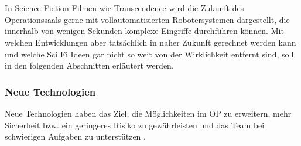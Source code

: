 \chapter{}
\label{sec:overview}

In Science Fiction Filmen wie Transcendence wird die Zukunft des Operationssaals gerne mit vollautomatisierten Robotersystemen dargestellt, die innerhalb von wenigen Sekunden komplexe Eingriffe durchführen können. 
Mit welchen Entwicklungen aber tatsächlich in naher Zukunft gerechnet werden kann und welche Sci Fi Ideen gar nicht so weit von der Wirklichkeit entfernt sind, soll in den folgenden Abschnitten erläutert werden.

\subsection{Neue Technologien}
Neue Technologien haben das Ziel, die Möglichkeiten im OP zu erweitern, mehr Sicherheit bzw. ein geringeres Risiko zu gewährleisten und das Team bei schwierigen Aufgaben zu unterstützen \cite{CurrentAndFuture}. 

